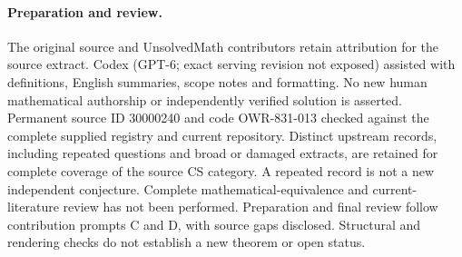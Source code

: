 \documentclass[11pt]{article}
\begin{document}
\paragraph{Preparation and review.}
The original source and UnsolvedMath contributors retain attribution for the source extract. Codex (GPT-6; exact serving revision not exposed) assisted with definitions, English summaries, scope notes and formatting. No new human mathematical authorship or independently verified solution is asserted. Permanent source ID 30000240 and code OWR-831-013 checked against the complete supplied registry and current repository. Distinct upstream records, including repeated questions and broad or damaged extracts, are retained for complete coverage of the source CS category. A repeated record is not a new independent conjecture. Complete mathematical-equivalence and current-literature review has not been performed. Preparation and final review follow contribution prompts C and D, with source gaps disclosed. Structural and rendering checks do not establish a new theorem or open status.
\label{end:30000240}
\end{document}
